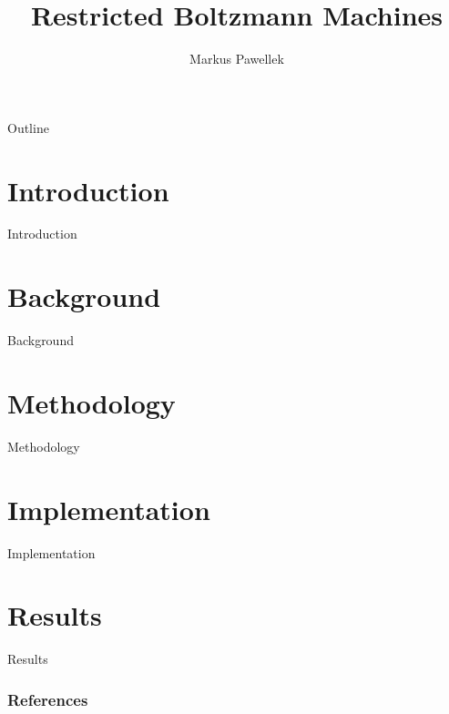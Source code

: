 \documentclass[aspectratio=169]{beamer}
\title{Restricted Boltzmann Machines}
\author{Markus Pawellek}
\begin{document}
  \frame{\titlepage}
  \begin{frame}{Outline}
    \footnotesize
    \hfill\parbox[t][7cm][l]{0.9\textwidth}{\tableofcontents}
  \end{frame}

  \section{Introduction} %
  \label{sec:introduction}
    \begin{frame}{Introduction}

    \end{frame}

  \section{Background} %
  \label{sec:background}
    \begin{frame}{Background}

    \end{frame}

  \section{Methodology} %
  \label{sec:methodology}
    \begin{frame}{Methodology}

    \end{frame}

  \section{Implementation} %
  \label{sec:implementation}
    \begin{frame}{Implementation}

    \end{frame}

  \section{Results} %
  \label{sec:results}
    \begin{frame}{Results}

    \end{frame}

  \begin{frame}
    \frametitle{References}
    \scriptsize
    \begin{multicols}{2}
      \nocite{*}
      
    \end{multicols}
  \end{frame}
\end{document}
